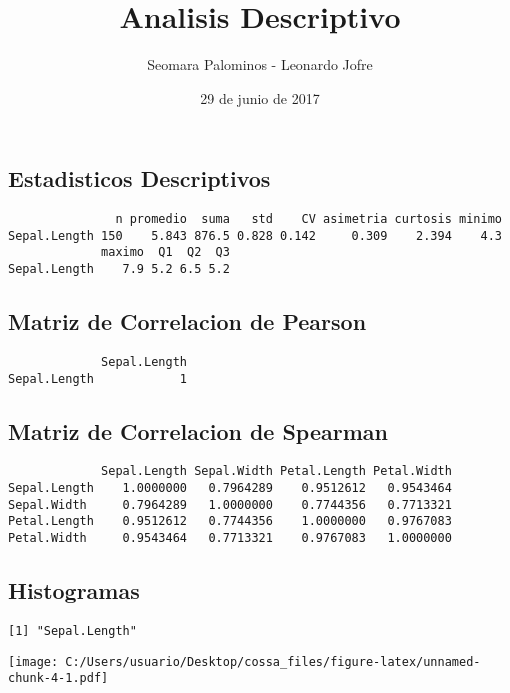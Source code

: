\documentclass[]{article}
\title{Analisis Descriptivo}
\author{Seomara Palominos - Leonardo Jofre}
\date{29 de junio de 2017}
\begin{document}
\maketitle

\subsection{Estadisticos Descriptivos}\label{estadisticos-descriptivos}

\begin{verbatim}
               n promedio  suma   std    CV asimetria curtosis minimo
Sepal.Length 150    5.843 876.5 0.828 0.142     0.309    2.394    4.3
             maximo  Q1  Q2  Q3
Sepal.Length    7.9 5.2 6.5 5.2
\end{verbatim}

\subsection{Matriz de Correlacion de
Pearson}\label{matriz-de-correlacion-de-pearson}

\begin{verbatim}
             Sepal.Length
Sepal.Length            1
\end{verbatim}

\subsection{Matriz de Correlacion de
Spearman}\label{matriz-de-correlacion-de-spearman}

\begin{verbatim}
             Sepal.Length Sepal.Width Petal.Length Petal.Width
Sepal.Length    1.0000000   0.7964289    0.9512612   0.9543464
Sepal.Width     0.7964289   1.0000000    0.7744356   0.7713321
Petal.Length    0.9512612   0.7744356    1.0000000   0.9767083
Petal.Width     0.9543464   0.7713321    0.9767083   1.0000000
\end{verbatim}

\pagebreak

\subsection{Histogramas}\label{histogramas}

\begin{verbatim}
[1] "Sepal.Length"
\end{verbatim}

\texttt{[image: C:/Users/usuario/Desktop/cossa\_files/figure-latex/unnamed-chunk-4-1.pdf]}
\end{document}

